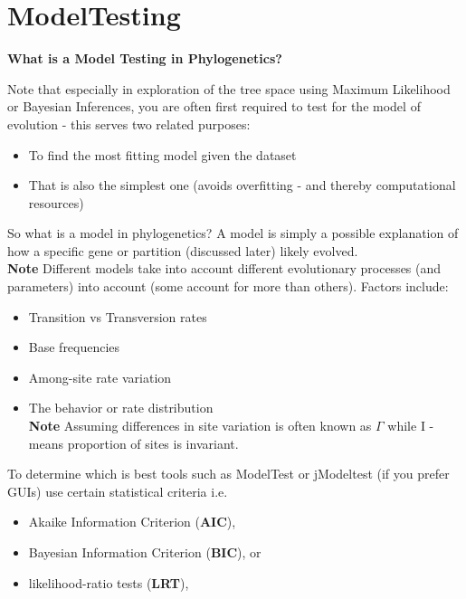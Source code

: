 \documentclass[11pt]{report}
\begin{document}
{\begin{tcolorbox}[label=box:Wavelets, colback=gray!10!white, coltitle=white, colframe=gray!80!black, title= Wavelets, breakable]
\end{tcolorbox}

\section{ModelTesting}
\begin{tcolorbox}[label=box:modeltesting, colback=gray!10!white, coltitle=white, colframe=gray!80!black, title=Model Testing in Phylogenetics, breakable]
	\textbf{What is a Model Testing in Phylogenetics?} 
	
	Note that especially in exploration of the tree space using Maximum Likelihood or Bayesian Inferences, you are often first required to test for the model of evolution - this serves two related purposes:
	\begin{itemize}
		\item To find the most fitting model given the dataset
		\item That is also the simplest one (avoids overfitting - and thereby computational resources)
	\end{itemize}
	
	So what is a model in phylogenetics? A model is simply a possible explanation of how a specific gene or partition (discussed later) likely evolved. \\
	\textbf{Note} Different models take into account different evolutionary processes (and parameters) into account (some account for more than others). Factors include:
	\begin{itemize}
		\item Transition vs Transversion rates
		\item Base frequencies
		\item Among-site rate variation
		\item The behavior or rate distribution \\ \textbf{Note} Assuming differences in site variation is often known as $\Gamma$ while I - means proportion of sites is invariant.
	\end{itemize}
		
	To determine which is best tools such as ModelTest or jModeltest (if you prefer GUIs) use certain statistical criteria i.e.
	\begin{itemize}
		\item Akaike Information Criterion (\textbf{AIC}),
		\item Bayesian Information Criterion (\textbf{BIC}), or
		\item likelihood-ratio tests (\textbf{LRT}), 
	\end{itemize}
	

\end{tcolorbox}}
\end{document}
